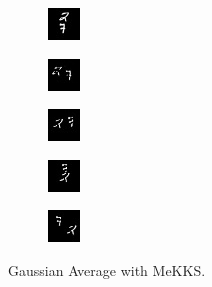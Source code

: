 \begin{subfigure}[t]{0.9\textwidth}
    \centering
    \begin{subfigure}[t]{0.19\textwidth}
        \centering
        \includegraphics[scale=2]{figures/MeKKS-DIFFERENCING/frame0}
    \end{subfigure}
    \hfill
    \begin{subfigure}[t]{0.19\textwidth}
        \centering
        \includegraphics[scale=2]{figures/MeKKS-DIFFERENCING/frame4}
    \end{subfigure}
    \hfill
    \begin{subfigure}[t]{0.19\textwidth}
        \centering
        \includegraphics[scale=2]{figures/MeKKS-DIFFERENCING/frame8}
    \end{subfigure}
    \hfill
    \begin{subfigure}[t]{0.19\textwidth}
        \centering
        \includegraphics[scale=2]{figures/MeKKS-DIFFERENCING/frame12}
    \end{subfigure}
    \hfill
    \begin{subfigure}[t]{0.19\textwidth}
        \centering
        \includegraphics[scale=2]{figures/MeKKS-DIFFERENCING/frame16}
    \end{subfigure}
    \caption{Gaussian Average with MeKKS.}
\end{subfigure}
\setcounter{subfigure}{0}
\renewcommand\thesubfigure{\alph{subfigure}}
